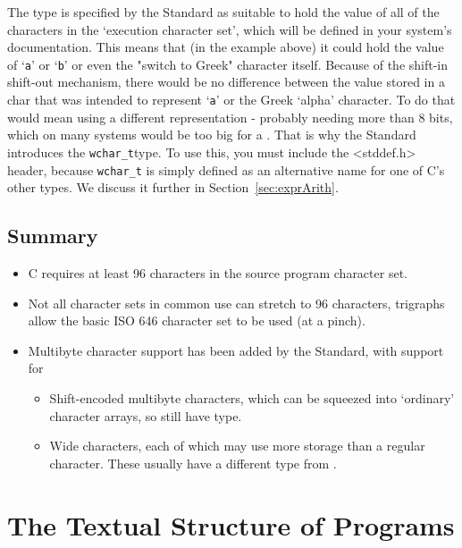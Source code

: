    The \kchar{} type is specified by the Standard as suitable to
    hold the value of all of the characters in the `execution character
    set', which will be defined in your system's documentation. This means
    that (in the example above) it could hold the value of
    `\texttt{a}' or `\texttt{b}' or even the "switch to
    Greek" character itself. Because of the shift-in shift-out mechanism,
    there would be no difference between the value stored in a char that was
    intended to represent `\texttt{a}' or the Greek `alpha'
    character. To do that would mean using a different representation -
    probably needing more than 8 bits, which on many systems would be too big
    for a \kchar. That is why the Standard introduces the
    \texttt{wchar\_t}type. To use this, you must include the
    <stddef.h> header, because \texttt{wchar\_t} is simply defined as
    an alternative name for one of C's other types. We discuss it further in
    Section~\ref{sec:exprArith}.


  

  \subsection{Summary}

   \begin{itemize}
    \item C requires at least 96 characters in the source program character
     set.
    \item Not all character sets in common use can stretch to 96 characters,
     trigraphs allow the basic ISO 646 character set to be used (at a
     pinch).
    \item Multibyte character support has been added by the Standard, with
     support for
     \begin{itemize}
      \item Shift-encoded multibyte characters, which can be squeezed into
       `ordinary' character arrays, so still have \kchar
       type.
      \item Wide characters, each of which may use more storage than a regular
       character. These usually have a different type from
       \kchar.
     \end{itemize}
    
   \end{itemize}

  

 
        \section{The Textual Structure of Programs}
        

